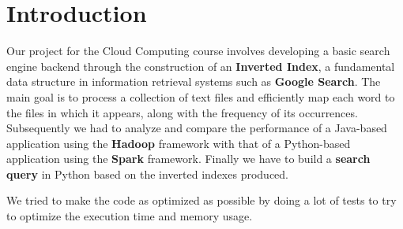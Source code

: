 \section{Introduction}
Our project for the Cloud Computing course involves developing a basic search engine backend through the construction of an \textbf{Inverted Index}, a fundamental data structure in information retrieval systems such as \textbf{Google Search}. The main goal is to process a collection of text files and efficiently map each word to the files in which it appears, along with the frequency of its occurrences. Subsequently we had to analyze and compare the performance of a Java-based application using the \textbf{Hadoop} framework with that of a Python-based application using the \textbf{Spark} framework. Finally we have to build a \textbf{search query} in Python based on the inverted indexes produced. 

We tried to make the code as optimized as possible by doing a lot of tests to try to optimize the execution time and memory usage.


